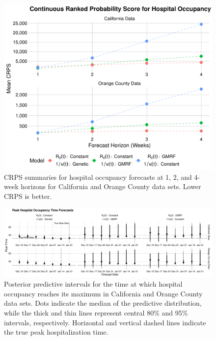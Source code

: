 \begin{figure}
    \centering
    \includegraphics[width=1.0\columnwidth]{real_data_crps_comparison_dotplot_data_hospitalizations_plot}
    \caption[CRPS summaries for hospital occupancy forecasts for real data sets.]{CRPS summaries for hospital occupancy forecasts at 1, 2, and 4-week horizons for California and Orange County data sets. Lower CRPS is better.}
    \label{ch_5:fig:real_data_crps_comparison_dotplot_data_hospitalizations_plot}
\end{figure}

\begin{figure}
    \centering
    \includegraphics[width=1.0\columnwidth]{real_data_peak_assessment_time_plot}
    \caption[Posterior predictive intervals for peak hospital occupancy timing for real data sets.]{Posterior predictive intervals for the time at which hospital occupancy reaches its maximum in California and Orange County data sets.
    Dots indicate the median of the predictive distribution, while the thick and thin lines represent central 80\% and 95\% intervals, respectively.
    Horizontal and vertical dashed lines indicate the true peak hospitalization time.}
    \label{ch_5:fig:real_data_peak_assessment_time_plot}
\end{figure}

